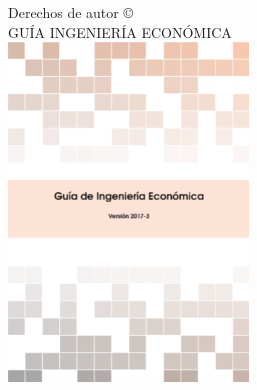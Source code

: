 \documentclass[11pt,fleqn]{book} %
\numberwithin{equation}{section} %
\numberwithin{figure}{section} %
\numberwithin{table}{section} %
\begin{document}









\newpage
\vfill
\thispagestyle{empty}

\noindent Derechos de autor \copyright\\ %

\noindent \textsc{GUÍA INGENIERÍA ECONÓMICA}\\ %

\includegraphics[height=9cm]{W_Varios/1_Portada_libro/gingeco.PNG}
\end{document}
